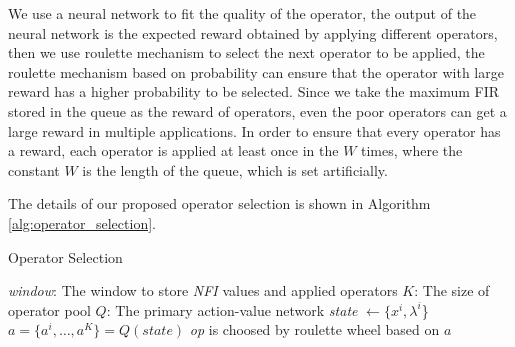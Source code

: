 \documentclass[journal]{IEEEtran}
\begin{document}
We use a neural network to fit the quality of the operator, the output of the neural network is the expected reward obtained by applying different operators, then we use roulette mechanism to select the next operator to be applied, the roulette mechanism based on probability can ensure that the operator with large reward has a higher probability to be selected.
Since we take the maximum FIR stored in the queue as the reward of operators, even the poor operators can get a large reward in multiple applications. In order to ensure that every operator has a reward, each operator is applied at least once in the $W$ times, where the constant $W$ is the length of the queue, which is set artificially.

The details of our proposed operator selection is shown in Algorithm \ref{alg:operator_selection}.

\begin{algorithm}
  \label{alg:operator_selection}
  \caption{Operator Selection}
  \small
  \textit{window}: The window to store \textit{NFI} values and applied operators\;  %
  $K$: The size of operator pool\;
  $Q$: The primary action-value network\;
  \textit{state} $\leftarrow \{x^i, \lambda^i$\}\;
  $a = \{ a^i, \dots , a^K \} = Q(\textit{state})$\;
  \textit{op} is choosed by roulette wheel based on $a$\;
  \;
\end{algorithm}

\end{document}
